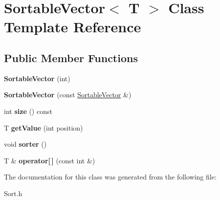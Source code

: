 \hypertarget{class_sortable_vector}{\section{Sortable\+Vector$<$ T $>$ Class Template Reference}
\label{class_sortable_vector}
}
\subsection*{Public Member Functions}
\begin{DoxyCompactItemize}
\item 
\hypertarget{class_sortable_vector_a368abcd55b20725f5432ed59ceaf32c9}{{\bfseries Sortable\+Vector} (int)}\label{class_sortable_vector_a368abcd55b20725f5432ed59ceaf32c9}

\item 
\hypertarget{class_sortable_vector_a4fc7e88ad62df25f52674c61b49ab402}{{\bfseries Sortable\+Vector} (const \hyperlink{class_sortable_vector}{Sortable\+Vector} \&)}\label{class_sortable_vector_a4fc7e88ad62df25f52674c61b49ab402}

\item 
\hypertarget{class_sortable_vector_a32c7457f2f4ad2c5a2d8a8fca159b54f}{int {\bfseries size} () const }\label{class_sortable_vector_a32c7457f2f4ad2c5a2d8a8fca159b54f}

\item 
\hypertarget{class_sortable_vector_a0d213de9ff82359a9ee30ddb5943970e}{T {\bfseries get\+Value} (int position)}\label{class_sortable_vector_a0d213de9ff82359a9ee30ddb5943970e}

\item 
\hypertarget{class_sortable_vector_a49e1016ea43758b84d02424faa9d8e61}{void {\bfseries sorter} ()}\label{class_sortable_vector_a49e1016ea43758b84d02424faa9d8e61}

\item 
\hypertarget{class_sortable_vector_a4bcb40b523a26311ce73719321e4818e}{T \& {\bfseries operator\mbox{[}$\,$\mbox{]}} (const int \&)}\label{class_sortable_vector_a4bcb40b523a26311ce73719321e4818e}

\end{DoxyCompactItemize}


The documentation for this class was generated from the following file\+:\begin{DoxyCompactItemize}
\item 
Sort.\+h\end{DoxyCompactItemize}
